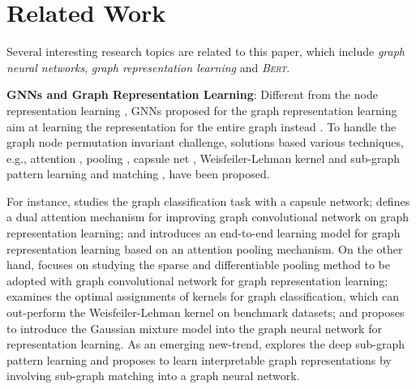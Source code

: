 \documentclass{article}
\newcommand{\bert}{\textsc{Bert}}
\begin{document}
\section{Related Work}\label{sec:related_work}

Several interesting research topics are related to this paper, which include \textit{graph neural networks}, \textit{graph representation learning} and \textit{{\bert}}. 

\noindent \textbf{GNNs and Graph Representation Learning}: Different from the node representation learning \cite{Kipf_Semi_CORR_16,Velickovic_Graph_ICLR_18}, GNNs proposed for the graph representation learning aim at learning the representation for the entire graph instead \cite{Narayanan_Graph_17}. To handle the graph node permutation invariant challenge, solutions based various techniques, e.g., attention \cite{Chen_Dual_19,Meltzer_Permutation_19}, pooling \cite{Meltzer_Permutation_19,ranjan2019asap,Jiang_Gaussian_18}, capsule net \cite{Mallea_Capsule_19}, Weisfeiler-Lehman kernel \cite{NIPS2016_6166} and sub-graph pattern learning and matching \cite{Meng_Isomorphic_NIPS_19}, have been proposed. 

For instance, \cite{Mallea_Capsule_19} studies the graph classification task with a capsule network; \cite{Chen_Dual_19} defines a dual attention mechanism for improving graph convolutional network on graph representation learning; and \cite{Meltzer_Permutation_19} introduces an end-to-end learning model for graph representation learning based on an attention pooling mechanism. On the other hand, \cite{ranjan2019asap} focuses on studying the sparse and differentiable pooling method to be adopted with graph convolutional network for graph representation learning; \cite{NIPS2016_6166} examines the optimal assignments of kernels for graph classification, which can out-perform the Weisfeiler-Lehman kernel on benchmark datasets; and \cite{Jiang_Gaussian_18} proposes to introduce the Gaussian mixture model into the graph neural network for representation learning. As an emerging new-trend, \cite{Meng_Isomorphic_NIPS_19} explores the deep sub-graph pattern learning and proposes to learn interpretable graph representations by involving sub-graph matching into a graph neural network.
\end{document}
